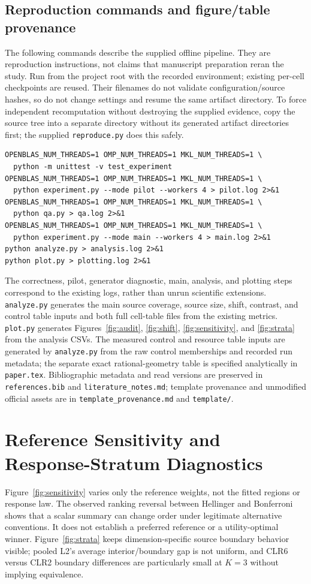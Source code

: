 \documentclass{article}
\theoremstyle{plain}
\begin{document}
\subsection{Reproduction commands and figure/table provenance}
The following commands describe the supplied offline pipeline. They are reproduction instructions, not claims that manuscript preparation reran the study. Run from the project root with the recorded environment; existing per-cell checkpoints are reused. Their filenames do not validate configuration/source hashes, so do not change settings and resume the same artifact directory. To force independent recomputation without destroying the supplied evidence, copy the source tree into a separate directory without its generated artifact directories first; the supplied \texttt{reproduce.py} does this safely.
\begin{verbatim}
OPENBLAS_NUM_THREADS=1 OMP_NUM_THREADS=1 MKL_NUM_THREADS=1 \
  python -m unittest -v test_experiment
OPENBLAS_NUM_THREADS=1 OMP_NUM_THREADS=1 MKL_NUM_THREADS=1 \
  python experiment.py --mode pilot --workers 4 > pilot.log 2>&1
OPENBLAS_NUM_THREADS=1 OMP_NUM_THREADS=1 MKL_NUM_THREADS=1 \
  python qa.py > qa.log 2>&1
OPENBLAS_NUM_THREADS=1 OMP_NUM_THREADS=1 MKL_NUM_THREADS=1 \
  python experiment.py --mode main --workers 4 > main.log 2>&1
python analyze.py > analysis.log 2>&1
python plot.py > plotting.log 2>&1
\end{verbatim}
The correctness, pilot, generator diagnostic, main, analysis, and plotting steps correspond to the existing logs, rather than unrun scientific extensions. \texttt{analyze.py} generates the main source coverage, source size, shift, contrast, and control table inputs and both full cell-table files from the existing metrics. \texttt{plot.py} generates Figures~\ref{fig:audit}, \ref{fig:shift}, \ref{fig:sensitivity}, and \ref{fig:strata} from the analysis CSVs. The measured control and resource table inputs are generated by \texttt{analyze.py} from the raw control memberships and recorded run metadata; the separate exact rational-geometry table is specified analytically in \texttt{paper.tex}. Bibliographic metadata and read versions are preserved in \texttt{references.bib} and \texttt{literature\_notes.md}; template provenance and unmodified official assets are in \texttt{template\_provenance.md} and \texttt{template/}.

\section{Reference Sensitivity and Response-Stratum Diagnostics}
\label{app:diagnostics}
Figure~\ref{fig:sensitivity} varies only the reference weights, not the fitted regions or response law. The observed ranking reversal between Hellinger and Bonferroni shows that a scalar summary can change order under legitimate alternative conventions. It does not establish a preferred reference or a utility-optimal winner. Figure~\ref{fig:strata} keeps dimension-specific source boundary behavior visible; pooled L2's average interior/boundary gap is not uniform, and CLR6 versus CLR2 boundary differences are particularly small at $K=3$ without implying equivalence.
\end{document}

